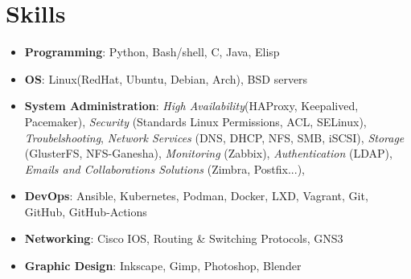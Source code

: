 \documentclass{cv}
\begin{document}
\section{Skills}

\begin{itemize}
  \item{\bf{Programming}}: Python, Bash/shell, C, Java, Elisp 
  \item{\bf{OS}}: Linux(RedHat, Ubuntu, Debian, Arch), BSD servers
  \item{\bf{System Administration}}: 
    \emph{High Availability}(HAProxy, Keepalived, Pacemaker),
    \emph{Security} (Standards Linux Permissions, ACL, SELinux),
    \emph{Troubelshooting},
    \emph{Network Services} (DNS, DHCP, NFS, SMB, iSCSI),
    \emph{Storage} (GlusterFS, NFS-Ganesha),
    \emph{Monitoring} (Zabbix),
    \emph{Authentication} (LDAP),
    \emph{Emails and Collaborations Solutions} (Zimbra, Postfix...),

  \item{\bf{DevOps}}: Ansible, Kubernetes, Podman, Docker, LXD, Vagrant, Git, GitHub, GitHub-Actions
  \item{\bf{Networking}}: Cisco IOS, Routing \& Switching Protocols, GNS3
  \item{\bf{Graphic Design}}: Inkscape, Gimp, Photoshop, Blender
\end{itemize}






\end{document}

